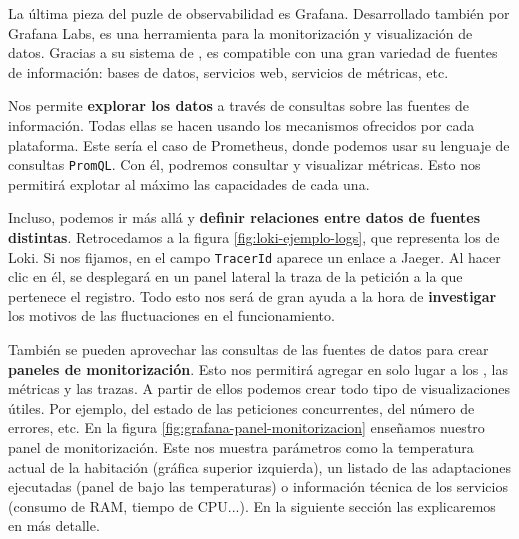 La última pieza del puzle de observabilidad es Grafana. Desarrollado también por Grafana Labs, es una herramienta para la monitorización y visualización de datos. Gracias a su sistema de , es compatible con una gran variedad de fuentes de información: bases de datos, servicios web, servicios de métricas, etc.

Nos permite \textbf{explorar los datos} a través de consultas sobre las fuentes de información. Todas ellas se hacen usando los mecanismos ofrecidos por cada plataforma. Este sería el caso de Prometheus, donde podemos usar su lenguaje de consultas \texttt{PromQL}. Con él, podremos consultar y visualizar métricas. Esto nos permitirá explotar al máximo las capacidades de cada una.

Incluso, podemos ir más allá y \textbf{definir relaciones entre datos de fuentes distintas}. Retrocedamos a la figura \ref{fig:loki-ejemplo-logs}, que representa los  de Loki. Si nos fijamos, en el campo \texttt{TracerId} aparece un enlace a Jaeger. Al hacer clic en él, se desplegará en un panel lateral la traza de la petición a la que pertenece el registro. Todo esto nos será de gran ayuda a la hora de \textbf{investigar} los motivos de las fluctuaciones en el funcionamiento.

También se pueden aprovechar las consultas de las fuentes de datos para crear \textbf{paneles de monitorización}. Esto nos permitirá agregar en solo lugar a los , las métricas y las trazas. A partir de ellos podemos crear todo tipo de visualizaciones útiles. Por ejemplo, del estado de las peticiones concurrentes, del número de errores, etc. En la figura \ref{fig:grafana-panel-monitorizacion} enseñamos nuestro panel de monitorización. Este nos muestra parámetros como la temperatura actual de la habitación (gráfica superior izquierda), un listado de las adaptaciones ejecutadas (panel de  bajo las temperaturas) o información técnica de los servicios (consumo de RAM, tiempo de CPU...). En la siguiente sección las explicaremos en más detalle.

